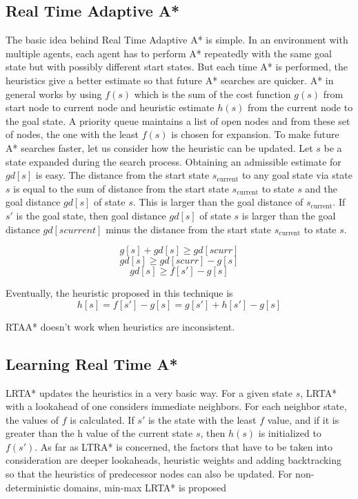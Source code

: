 \documentclass[tog]{acmsiggraph}
\begin{document}
\subsection{Real Time Adaptive A*}

The basic idea behind Real Time Adaptive A* is simple. In an
environment with multiple agents, each agent has to perform A*
repeatedly with the same goal state but with possibly different start
states. But each time A* is performed, the heuristics give a better
estimate so that future A* searches are quicker. A* in general works
by using \(f(s)\) which is the sum of the cost function \(g(s)\) from
start node to current node and heuristic estimate \(h(s)\) from the
current node to the goal state. A priority queue maintains a list of
open nodes and from these set of nodes, the one with the least
\(f(s)\) is chosen for expansion. To make future A* searches faster,
let us consider how the heuristic can be updated. Let \(s\) be a state
expanded during the search process. Obtaining an admissible estimate
for \(gd[s]\) is easy. The distance from the start state
\(s_\text{current}\) to any goal state via state \(s\) is equal to the
sum of distance from the start state \(s_\text{current}\) to state
\(s\) and the goal distance \(gd[s]\) of state \(s\). This is larger
than the goal distance of \(s_\text{current}\). If \(s'\) is the goal
state, then goal distance \(gd[s]\) of state \(s\) is larger than the
goal distance \(gd[scurrent]\) minus the distance from the start state
\(s_\text{current}\) to state \(s\).

\[ g[s] + gd[s] \geq gd[scurr] \]
\[ gd[s] \geq gd[scurr] - g[s] \]
\[ gd[s] \geq f[s'] - g[s] \]

Eventually, the heuristic proposed in this technique is
\[ h[s] = f[s'] - g[s] = g[s'] + h[s'] - g[s] \]

RTAA* doesn’t work when heuristics are inconsistent.  

\subsection{Learning Real Time A*}

LRTA* updates the heuristics in a very basic way. For a given state
\(s\), LRTA* with a lookahead of one considers immediate neighbors.
For each neighbor state, the values of \(f\) is calculated. If \(s'\)
is the state with the least \(f\) value, and if it is greater than the
h value of the current state \(s\), then \(h(s)\) is initialized to
\(f(s')\). As far as LTRA* is concerned, the factors that have to be
taken into consideration are deeper lookaheads, heuristic weights and
adding backtracking so that the heuristics of predecessor nodes can
also be updated. For non-deterministic domains, min-max LRTA* is
proposed


\nocite{*}

\end{document}
